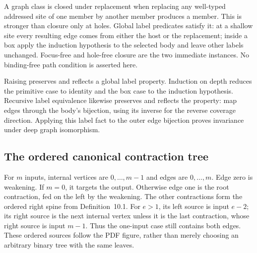 



A graph class is closed under replacement when replacing any well-typed
addressed site of one member by another member produces a member. This is
stronger than closure only at holes. Global label predicates satisfy it:
at a shallow site every resulting edge comes from either the host or the
replacement; inside a box apply the induction hypothesis to the selected body
and leave other labels unchanged. Focus-free and hole-free closure are the
two immediate instances. No binding-free path condition is asserted here.





Raising preserves and reflects a global label property. Induction on depth
reduces the primitive case to identity and the box case to the induction
hypothesis. Recursive label equivalence likewise preserves and reflects the
property: map edges through the body's bijection, using its inverse for the
reverse coverage direction. Applying this label fact to the outer edge
bijection proves invariance under deep graph isomorphism.




\subsection{The ordered canonical contraction tree}

For $m$ inputs, internal vertices are $0,\ldots,m-1$ and edges are
$0,\ldots,m$. Edge zero is weakening. If $m=0$, it targets the output.
Otherwise edge one is the root contraction, fed on the left by the weakening.
The other contractions form the ordered right spine from Definition~10.1.
For $e>1$, its left source is input $e-2$; its right source is the next
internal vertex unless it is the last contraction, whose right source is
input $m-1$. Thus the one-input case still contains both edges. These ordered
sources follow the PDF figure, rather than merely choosing an arbitrary
binary tree with the same leaves.

